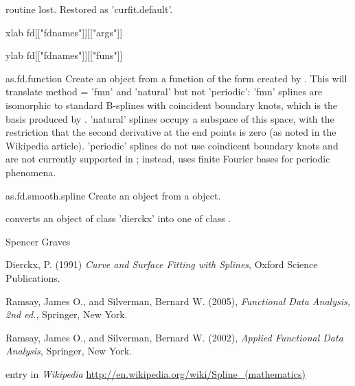 \documentclass{article}
\begin{document}
\begin{Details}
{{\item[routine] lost.  Restored as 'curfit.default'.
\item[xlab] fd[["fdnames"]][["args"]]
\item[ylab] fd[["fdnames"]][["funs"]]
}


\item[as.fd.function] Create an  object from a function of the form created by
.  This will translate method = 'fmn' and
'natural' but not 'periodic':  'fmn' splines are isomorphic to
standard B-splines with coincident boundary knots, which is the
basis produced by .  'natural' splines
occupy a subspace of this space, with the restriction that the
second derivative at the end points is zero (as noted in the
Wikipedia  article).  'periodic' splines do not use
coindicent boundary knots and are not currently supported in
;  instead,  uses finite Fourier bases for
periodic phenomena.  


\item[as.fd.smooth.spline] Create an  object from a  object.

}
\end{Details}
\begin{Value}
 converts an object of class 'dierckx' into one of
class .
\end{Value}
\begin{Author}\relax
Spencer Graves
\end{Author}
\begin{References}\relax
Dierckx, P. (1991) \emph{Curve and Surface Fitting with Splines},
Oxford Science Publications.

Ramsay, James O., and Silverman, Bernard W. (2005), \emph{Functional 
Data Analysis, 2nd ed.}, Springer, New York. 

Ramsay, James O., and Silverman, Bernard W. (2002), \emph{Applied
Functional Data Analysis}, Springer, New York.

 entry in \emph{Wikipedia}
\url{http://en.wikipedia.org/wiki/Spline_(mathematics)}
\end{References}
\begin{SeeAlso}\relax
{}
\end{SeeAlso}
\end{document}
